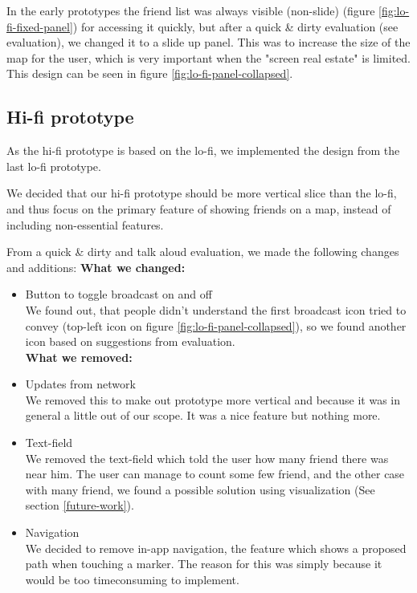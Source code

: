 \documentclass[runningheads,a4paper]{llncs}
\begin{document}
In the early prototypes the friend list was always visible (non-slide) (figure \ref{fig:lo-fi-fixed-panel}) for accessing it quickly, but after a quick \& dirty evaluation (see evaluation), we changed it to a slide up panel. This was to increase the size of the map for the user, which is very important when the "screen real estate" is limited. This design can be seen in figure \ref{fig:lo-fi-panel-collapsed}.

\subsection{Hi-fi prototype}

As the hi-fi prototype is based on the lo-fi, we implemented the design from the last lo-fi prototype. 

We decided that our hi-fi prototype should be more vertical slice than the lo-fi, and thus focus on the primary feature of showing friends on a map, instead of including non-essential features. 

From a quick \& dirty and talk aloud evaluation, we made the following changes and additions:
\textbf{What we changed:}\begin{itemize}
\item Button to toggle broadcast on and off\\
We found out, that people didn’t understand the first broadcast icon tried to convey (top-left icon on figure \ref{fig:lo-fi-panel-collapsed}), so we found another icon based on suggestions from evaluation. \\

\textbf{What we removed:}
\item Updates from network\\
We removed this to make out prototype more vertical and because it was in general a little out of our scope. It was a nice feature but nothing more. \\

\item Text-field\\
We removed the text-field which told the user how many friend there was near him. The user can manage to count some few friend, and the other case with many friend, we found a possible solution using visualization (See section \ref{future-work}). \\

\item Navigation\\
We decided to remove in-app navigation, the feature which shows a proposed path when touching a marker. The reason for this was simply because it would be too timeconsuming to implement.

\end{itemize}
\end{document}
